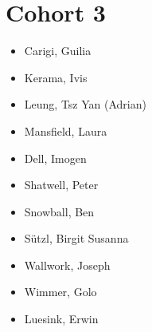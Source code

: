 \documentclass{article}
\begin{document}
\section*{Cohort 3}
\begin{itemize}
    \item Carigi, Guilia  \cite{hanlon2021future}
    \item Kerama, Ivis %
    \item Leung, Tsz Yan (Adrian) \cite{leung2020impact, leung2019atmospheric,leung2021forecast}
    \item Mansfield, Laura \cite{mansfield2020predicting} %
    \item Dell, Imogen
    \item Shatwell, Peter \cite{shatwell2020ocean} %
    \item Snowball, Ben \cite{snowball2020sparse,snowball2021sparse}
    \item Sützl, Birgit Susanna \cite{sutzl2021drag,sutzl2021distributed}
    \item Wallwork, Joseph \cite{wallwork2020goal,clare2022multi,wallwork2022goal} %
    \item Wimmer, Golo \cite{wimmer2020energy,wimmer2021energy} %
    \item Luesink, Erwin \cite{geurts2019lyapunov, de2020implications,holm2021stochastic,holm2021stochastic} %
\end{itemize}
\end{document}
